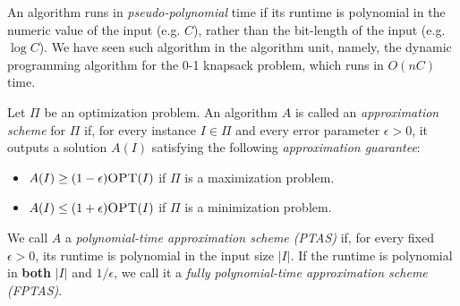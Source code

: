 \documentclass[12pt, letterpaper]{article}
\begin{document}
\begin{problem}{}
    An algorithm runs in \emph{pseudo-polynomial} time if its runtime is polynomial in the numeric value of the input (e.g. $C$), rather than the bit-length of the input (e.g. $\log C$). We have seen such algorithm in the algorithm unit, namely, the dynamic programming algorithm for the 0-1 knapsack problem, which runs in $O(nC)$ time. 

 Let $\Pi$ be an optimization problem. An algorithm $A$ is called an \emph{approximation scheme} for $\Pi$ if, for every instance $I \in \Pi$ and every error parameter $\epsilon > 0$, it outputs a solution $A(I)$ satisfying the following \emph{approximation guarantee}: 
\begin{itemize} 
    \item $A(I) \geq (1 - \epsilon)\textsc{OPT}(I)$ if $\Pi$ is a maximization problem. 
    \item $A(I) \leq (1 + \epsilon)\textsc{OPT}(I)$ if $\Pi$ is a minimization problem. 
\end{itemize}
    We call $A$ a \emph{polynomial-time approximation scheme (PTAS)} if, for every fixed $\epsilon > 0$, its runtime is polynomial in the input size $|I|$. If the runtime is polynomial in \textbf{both} $|I|$ and $1/\epsilon$, we call it a \emph{fully polynomial-time approximation scheme (FPTAS)}.
\end{problem}
\end{document}
